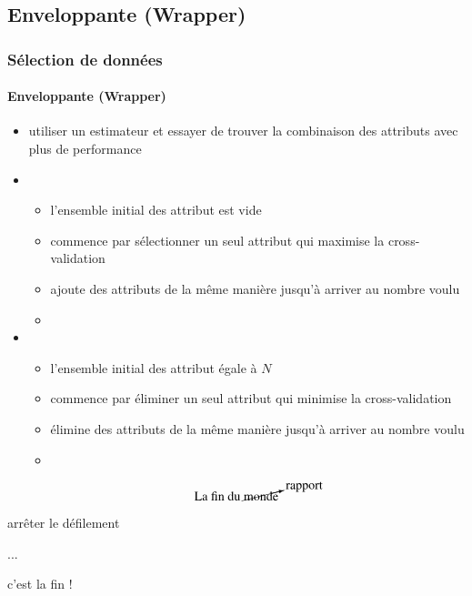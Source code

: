 \documentclass[xcolor=table]{beamer}
\begin{document}
\subsection{Enveloppante (Wrapper)}

\begin{frame}
	\frametitle{Sélection de données}
	\framesubtitle{Enveloppante (Wrapper)}
	
	\begin{itemize}
		\item utiliser un estimateur et essayer de trouver la combinaison des attributs avec plus de performance
		\item {}
		\begin{itemize}
			\item l'ensemble initial des attribut est vide
			\item commence par sélectionner un seul attribut qui maximise la cross-validation
			\item ajoute des attributs de la même manière jusqu'à arriver au nombre voulu
			\item {}
		\end{itemize}
		\item {}
		\begin{itemize}
			\item l'ensemble initial des attribut égale à $N$
			\item commence par éliminer un seul attribut qui minimise la cross-validation
			\item élimine des attributs de la même manière jusqu'à arriver au nombre voulu
			\item {}
		\end{itemize}
	\end{itemize}
	
\end{frame}


\begin{frame}
	
	\Huge 
	\[
	\text{La fin du } \cancelto{\text{rapport}}{\text{monde}}
	\]

	
		
	
	
	
\end{frame}

\begin{frame}
	
	\begin{center}
		\Huge 
		arrêter le défilement 
		
		... 
		
		c'est la fin !
	\end{center}
	
\end{frame}



\end{document}
